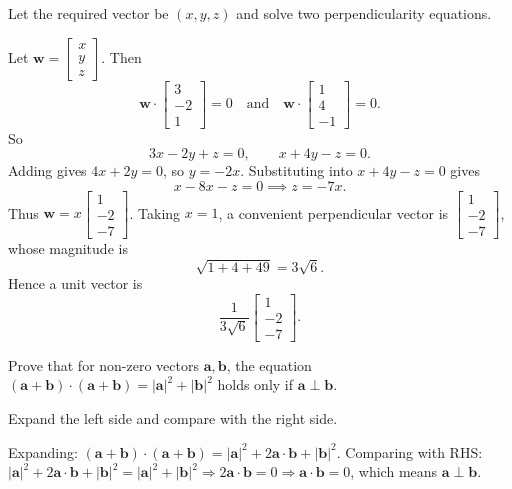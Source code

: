 \begin{hint}
Let the required vector be $(x,y,z)$ and solve two perpendicularity equations.
\end{hint}

\begin{solution}[Sketch]
Let $\mathbf{w} = \begin{bmatrix} x \\ y \\ z \end{bmatrix}$. Then
\[
\mathbf{w} \cdot \begin{bmatrix} 3 \\ -2 \\ 1 \end{bmatrix} = 0
\quad \text{and} \quad
\mathbf{w} \cdot \begin{bmatrix} 1 \\ 4 \\ -1 \end{bmatrix} = 0.
\]
So
\[
3x - 2y + z = 0, \qquad x + 4y - z = 0.
\]
Adding gives $4x + 2y = 0$, so $y = -2x$. Substituting into $x + 4y - z = 0$ gives
\[
x - 8x - z = 0 \implies z = -7x.
\]
Thus $\mathbf{w} = x\begin{bmatrix} 1 \\ -2 \\ -7 \end{bmatrix}$. Taking $x = 1$, a convenient perpendicular vector is $\begin{bmatrix} 1 \\ -2 \\ -7 \end{bmatrix}$, whose magnitude is
\[
\sqrt{1 + 4 + 49} = 3\sqrt{6}.
\]
Hence a unit vector is
\[
\frac{1}{3\sqrt{6}}\begin{bmatrix} 1 \\ -2 \\ -7 \end{bmatrix}.
\]
\end{solution}

\vspace{1em}

\begin{problem}
Prove that for non-zero vectors $\mathbf{a}, \mathbf{b}$, the equation $(\mathbf{a} + \mathbf{b}) \cdot (\mathbf{a} + \mathbf{b}) = |\mathbf{a}|^2 + |\mathbf{b}|^2$ holds only if $\mathbf{a} \perp \mathbf{b}$.
\end{problem}

\begin{hint}
Expand the left side and compare with the right side.
\end{hint}

\begin{solution}[Sketch]
Expanding: $(\mathbf{a} + \mathbf{b}) \cdot (\mathbf{a} + \mathbf{b}) = |\mathbf{a}|^2 + 2\mathbf{a} \cdot \mathbf{b} + |\mathbf{b}|^2$. Comparing with RHS: $|\mathbf{a}|^2 + 2\mathbf{a} \cdot \mathbf{b} + |\mathbf{b}|^2 = |\mathbf{a}|^2 + |\mathbf{b}|^2 \Rightarrow 2\mathbf{a} \cdot \mathbf{b} = 0 \Rightarrow \mathbf{a} \cdot \mathbf{b} = 0$, which means $\mathbf{a} \perp \mathbf{b}$.
\end{solution}

\vspace{1em}
